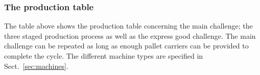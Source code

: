 \documentclass[12pt,twoside]{article}
\begin{document}








\subsubsection{The production table}

The table above shows the production table concerning the main
challenge; the three staged production process as well as the express
good challenge. The main challenge can be repeated as long as enough
pallet carriers can be provided to complete the cycle. The different
machine types are specified in Sect.~\ref{sec:machines}.
\end{document}
